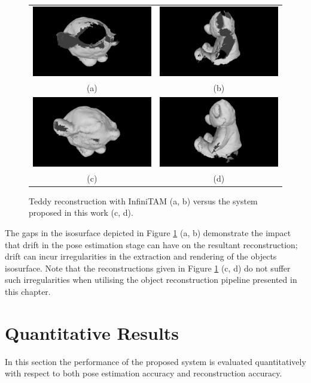 \begin{figure}[ht]
  \label{fig:probobj_gappy_teddy}
	\centering
	\begin{tabular}{cc}
		\includegraphics[width=.2\linewidth]{figures/object_recon/gappy/one_scene00.png}&
    \includegraphics[width=.2\linewidth]{figures/object_recon/gappy/one_scene01.png}\\
    (a) & (b) \\
		\includegraphics[width=.2\linewidth]{figures/object_recon/gappy/multi_scene00.png}&
    \includegraphics[width=.2\linewidth]{figures/object_recon/gappy/multi_scene01.png}\\
    (c) & (d)\\
	\end{tabular}
  \caption[Probabilistic Object Reconstruction Qualitative Results V]
  {
    Teddy reconstruction with InfiniTAM (a, b) versus the system proposed in this 
    work (c, d).
	}
\end{figure}

The gaps in the isosurface depicted in Figure \ref{fig:probobj_gappy_teddy} (a, b) 
demonstrate the impact that drift in the pose estimation stage can have on the resultant 
reconstruction; drift can incur irregularities in the extraction and rendering of the objects 
isosurface. Note that the reconstructions given in Figure \ref{fig:probobj_gappy_teddy} 
(c, d) do not suffer such irregularities when utilising the object reconstruction pipeline 
presented in this chapter.

\section{Quantitative Results}
In this section the performance of the proposed system is evaluated quantitatively with respect 
to both pose estimation accuracy and reconstruction accuracy. 

